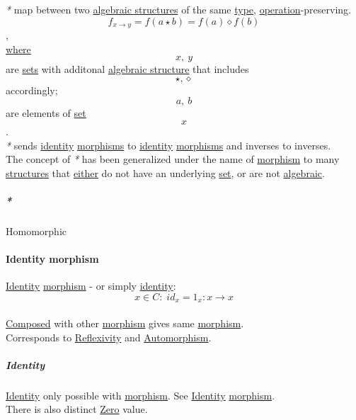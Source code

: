 \documentclass[11pt]{article}
\begin{document}
\emph{*} map between two \hyperref[org0b3e581]{algebraic structures} of the same \hyperref[orgc4aea2f]{type}, \hyperref[org1173fe8]{operation}-preserving.\\

$$ f_{x \to y} = f(a \star b) = f(a) \diamond f(b) $$,\\
\hyperref[org3e5903d]{where} $$ x,\ y $$ are \hyperref[org58ec608]{sets} with additonal \hyperref[org2ee73e8]{algebraic structure} that includes $$ \star, \diamond $$ accordingly; $$ a,\ b $$ are elements of \hyperref[org1faf06d]{set} $$ x $$.\\

\emph{*} sends \hyperref[org9b95fd5]{identity} \hyperref[org6c2fa5c]{morphisms} to \hyperref[org9b95fd5]{identity} \hyperref[org6c2fa5c]{morphisms} and inverses to inverses.\\

The concept of \emph{*} has been generalized under the name of \hyperref[org5de09d4]{morphism} to many \hyperref[orgc87c48c]{structures} that \hyperref[org6f16842]{either} do not have an underlying \hyperref[org1faf06d]{set}, or are not \hyperref[orge9081c5]{algebraic}.\\

\subparagraph{\emph{*}}
\label{sec:org2fc7a84}

\label{org751be18}Homomorphic\\

\paragraph{\label{org719f4de}Identity morphism}
\label{sec:org6b24574}
\hyperref[org9b95fd5]{Identity} \hyperref[org5de09d4]{morphism} - or simply \hyperref[org9b95fd5]{identity}: $$ x \in C : \; id_{x}=1_{x} : x \to x $$\\
\hyperref[orgc78ac5d]{Composed} with other \hyperref[org5de09d4]{morphism} gives same \hyperref[org5de09d4]{morphism}.\\

Corresponds to \hyperref[orge9d4ceb]{Reflexivity} and \hyperref[org4f0787d]{Automorphism}.\\

\subparagraph{\label{org9b95fd5}Identity}
\label{sec:orgd19fc02}
\hyperref[org9b95fd5]{Identity} only possible with \hyperref[org5de09d4]{morphism}. See \hyperref[org9b95fd5]{Identity} \hyperref[org5de09d4]{morphism}.\\

There is also distinct \hyperref[org5d1963a]{Zero} value.\\
\end{document}
